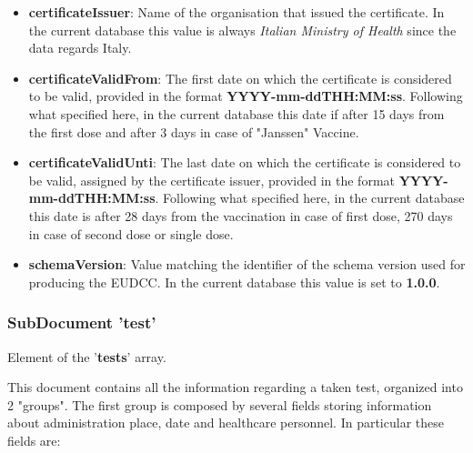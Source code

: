 \documentclass{article}[IEEEtran]
\begin{document}
\begin{itemize}
        
        \item \textbf{certificateIssuer}: Name of the organisation that issued the certificate. In the current database this value is always \textit{Italian Ministry of Health} since the data regards Italy.
        
        \item \textbf{certificateValidFrom}: The first date on which the certificate is considered to be valid, provided in the format \textbf{YYYY-mm-ddTHH:MM:ss}. Following what specified here, in the current database this date if after 15 days from the first dose and after 3 days in case of "Janssen" Vaccine.
        
        \item \textbf{certificateValidUnti}: The last date on which the certificate is considered to be valid, assigned by the certificate issuer, provided in the format \textbf{YYYY-mm-ddTHH:MM:ss}. Following what specified here, in the current database this date is after 28 days from the vaccination in case of first dose, 270 days in case of second dose or single dose.
        
        \item \textbf{schemaVersion}: Value matching the identifier of the schema version used for producing the EUDCC. In the current database this value is set to \textbf{1.0.0}.
        
    \end{itemize}
    
    
\subsubsection{SubDocument 'test'}
Element of the '\textbf{tests}' array.

This document contains all the information regarding a taken test, organized into 2 "groups".
The first group is composed by several fields storing information about administration place, date and healthcare personnel. 
In particular these fields are:
\end{document}
